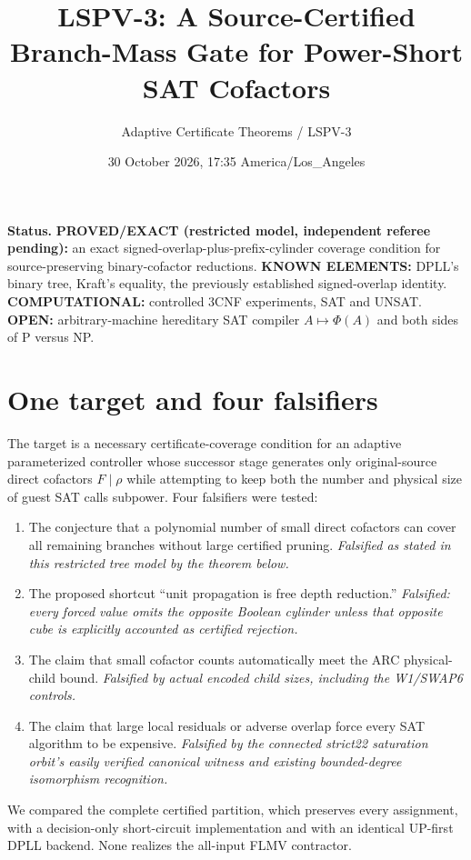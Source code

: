 \documentclass[10pt]{article}
\title{LSPV-3: A Source-Certified Branch-Mass Gate for Power-Short SAT Cofactors}
\author{Adaptive Certificate Theorems / LSPV-3}
\date{30 October 2026, 17:35 America/Los\_Angeles}
\begin{document}
\maketitle
\noindent\textbf{Status.} \textbf{PROVED/EXACT (restricted model, independent referee pending):} an exact signed-overlap-plus-prefix-cylinder coverage condition for source-preserving binary-cofactor reductions. \textbf{KNOWN ELEMENTS:} DPLL's binary tree, Kraft's equality, the previously established signed-overlap identity. \textbf{COMPUTATIONAL:} controlled 3CNF experiments, SAT and UNSAT. \textbf{OPEN:} arbitrary-machine hereditary SAT compiler $A\mapsto\Phi(A)$ and both sides of P versus NP.

\section{One target and four falsifiers}
The target is a necessary certificate-coverage condition for an adaptive parameterized controller whose successor stage generates only original-source direct cofactors $F\mid\rho$ while attempting to keep both the number and physical size of guest SAT calls subpower. Four falsifiers were tested:
\begin{enumerate}
\item The conjecture that a polynomial number of small direct cofactors can cover all remaining branches without large certified pruning. \emph{Falsified as stated in this restricted tree model by the theorem below.}
\item The proposed shortcut ``unit propagation is free depth reduction.'' \emph{Falsified: every forced value omits the opposite Boolean cylinder unless that opposite cube is explicitly accounted as certified rejection.}
\item The claim that small cofactor counts automatically meet the ARC physical-child bound. \emph{Falsified by actual encoded child sizes, including the W1/SWAP6 controls.}
\item The claim that large local residuals or adverse overlap force every SAT algorithm to be expensive. \emph{Falsified by the connected strict22 saturation orbit's easily verified canonical witness and existing bounded-degree isomorphism recognition.}
\end{enumerate}
We compared the complete certified partition, which preserves every assignment, with a decision-only short-circuit implementation and with an identical UP-first DPLL backend. None realizes the all-input FLMV contractor.
\end{document}
